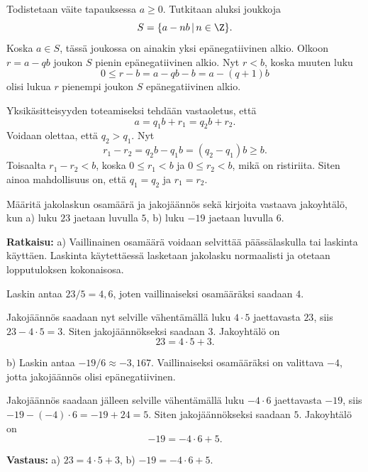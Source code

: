 
\begin{todistus}%
Todistetaan väite tapauksessa $a\ge 0$. Tutkitaan aluksi joukkoja
\[
S = \{ a-nb\,|\, n\in \Z\}.
\]
Koska $a\in S$, tässä joukossa on ainakin yksi epänegatiivinen alkio. Olkoon $r=a-qb$ joukon $S$ pienin epänegatiivinen alkio. Nyt $r < b$, koska muuten luku 
\[
0\le r - b = a - qb - b = a - (q+1)b 
\]
olisi lukua $r$ pienempi joukon $S$ epänegatiivinen alkio.

Yksikäsitteisyyden toteamiseksi tehdään vastaoletus, että
\[
a= q_1b+r_1 = q_2b+r_2.
\]
Voidaan olettaa, että $q_2>q_1$. Nyt
\[
r_1 - r_2 = q_2b - q_1b = (q_2-q_1)b \ge b.
\]
Toisaalta $r_1-r_2<b$, koska $0\le r_1 < b$ ja $0\le r_2 < b$, mikä on ristiriita. Siten ainoa mahdollisuus on, että $q_1=q_2$ ja $r_1=r_2$. 
\end{todistus}

\begin{esimerkki}
Määritä jakolaskun osamäärä ja jakojäännös sekä kirjoita vastaava jakoyhtälö, kun
a) luku $23$ jaetaan luvulla $5$,  b)  luku $-19$ jaetaan luvulla $6$.

{\bf Ratkaisu:}
a) Vaillinainen osamäärä voidaan selvittää päässälaskulla tai laskinta käyttäen. Laskinta käytettäessä lasketaan jakolasku normaalisti ja otetaan lopputuloksen kokonaisosa.

Laskin antaa $23/5 = 4,6$, joten vaillinaiseksi osamääräksi saadaan $4$.

Jakojäännös saadaan nyt selville vähentämällä luku $4\cdot 5$ jaettavasta $23$, siis $23-4\cdot 5=3$. Siten jakojäännökseksi saadaan $3$. 
Jakoyhtälö on
\[
23 = 4\cdot 5 + 3.
\]

b) Laskin antaa $-19/6 \approx -3,167$. Vaillinaiseksi osamääräksi on valittava $-4$, jotta jakojäännös olisi epänegatiivinen.

Jakojäännös saadaan jälleen selville vähentämällä luku $-4\cdot 6$ jaettavasta $-19$, siis $-19-(-4)\cdot 6=-19+24=5$. Siten jakojäännökseksi saadaan $5$. 
Jakoyhtälö on
\[
-19 = -4\cdot 6 +5.
\]

{\bf Vastaus:} a) $23 = 4\cdot 5 + 3$, b) $-19 = -4\cdot 6 +5$.
\end{esimerkki}

\bigskip

